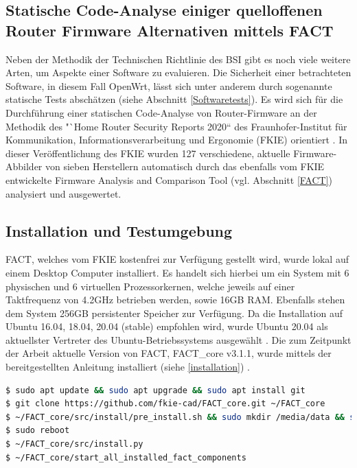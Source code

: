 \documentclass[a4paper]{book}
\begin{document}
\begin{large}
\section[Statische Code-Analyse mit FACT]{Statische Code-Analyse einiger quelloffenen Router Firmware Alternativen mittels FACT}
\label{statische CodeA}
\begin{onehalfspace}
Neben der Methodik der Technischen Richtlinie des BSI gibt es noch viele weitere Arten, um Aspekte einer Software zu evaluieren. Die Sicherheit einer betrachteten Software, in diesem Fall OpenWrt, lässt sich unter anderem durch sogenannte statische Tests abschätzen (siehe Abschnitt \ref{Softwaretests}). Es wird sich für die Durchführung einer statischen Code-Analyse von Router-Firmware an der Methodik des "`Home Router Security Reports 2020“ des Fraunhofer-Institut für Kommunikation, Informationsverarbeitung und Ergonomie (FKIE) orientiert \cite{PeterWeidenbachJohannesvomDorp.2020}. In dieser Veröffentlichung des FKIE wurden 127 verschiedene, aktuelle Firmware-Abbilder von sieben Herstellern automatisch durch das ebenfalls vom FKIE entwickelte \glqq Firmware Analysis and Comparison Tool\grqq{} (vgl. Abschnitt \ref{FACT}) analysiert und ausgewertet.
\end{onehalfspace}


\subsection{Installation und Testumgebung}
\begin{onehalfspace}
FACT, welches vom FKIE kostenfrei zur Verfügung gestellt wird, wurde lokal auf einem Desktop Computer installiert. Es handelt sich hierbei um ein System mit 6 physischen und 6 virtuellen Prozessorkernen, welche jeweils auf einer Taktfrequenz von 4.2GHz betrieben werden, sowie 16GB RAM. Ebenfalls stehen dem System 256GB persistenter Speicher zur Verfügung. Da die Installation auf Ubuntu 16.04, 18.04, 20.04 (stable) empfohlen wird, wurde Ubuntu 20.04 als aktuellster Vertreter des Ubuntu-Betriebssystems ausgewählt \cite{FraunhoferFKIE.2020b}. Die zum Zeitpunkt der Arbeit aktuelle Version von FACT, FACT\_core v3.1.1, wurde mittels der bereitgestellten Anleitung installiert (siehe \ref{installation}) \cite{FraunhoferFKIE.2020}. \\


\begin{lstlisting}[language=sh,label={installation}, caption={Installationsschritte für das \glqq Firmware Analysis and Comparison Tool\grqq{} des FKIE. Diese Schritte Updaten die installierten Pakete, downloadet das Git Repository und führt alle nötigen Schritte zur Installation aus. Zuletzt wird das Programm gestartet.}]
$ sudo apt update && sudo apt upgrade && sudo apt install git
$ git clone https://github.com/fkie-cad/FACT_core.git ~/FACT_core
$ ~/FACT_core/src/install/pre_install.sh && sudo mkdir /media/data && sudo chown -R USER /media/data
$ sudo reboot
$ ~/FACT_core/src/install.py
$ ~/FACT_core/start_all_installed_fact_components


\end{lstlisting}
\end{onehalfspace}
\end{large}
\end{document}
